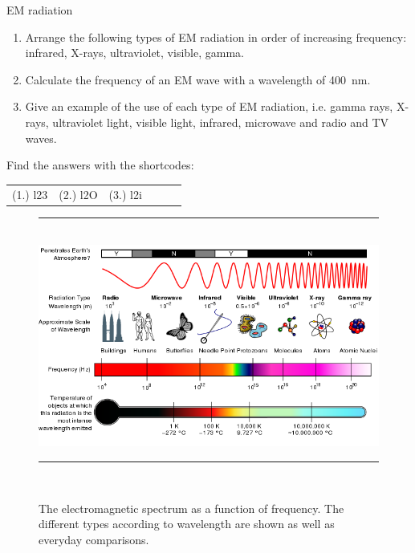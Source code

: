 \begin{exercises}{EM radiation}
            \nopagebreak
      \label{m38778*id188768}\begin{enumerate}[noitemsep, label=\textbf{\arabic*}. ] 
            \label{m38778*uid10}\item Arrange the following types of EM radiation in order of increasing frequency: infrared, X-rays, ultraviolet, visible, gamma.\newline
\label{m38778*uid11}\item Calculate the frequency of an EM wave with a wavelength of 400~nm.\newline
\label{m38778*uid12}\item Give an example of the use of each type of EM radiation, i.e. gamma rays, X-rays, ultraviolet light, visible light, infrared, microwave and radio and TV waves.\newline
\end{enumerate}
    \label{m38778*cid6}
\par {} Find the answers with the shortcodes:
 \par \begin{tabular}[h]{cccccc}
 (1.) l23  &  (2.) l2O  &  (3.) l2i  & \end{tabular}
\end{exercises}
	\begin{figure}[H] %
    \begin{center}
    \rule[.1in]{\figurerulewidth}{.005in} \\
        \label{m38778*uid3!!!underscore!!!media}\label{m38778*uid3!!!underscore!!!printimage}\includegraphics[width=\columnwidth]{col11305.imgs/m38778_EM_Spectrum_Properties_edit.png} %
      \label{fig:emspectrum}
      \caption{The electromagnetic spectrum as a function of frequency. The different types according to wavelength are shown as well as everyday comparisons.
	}
    \rule[.1in]{\figurerulewidth}{.005in} \\
    \end{center}
 \end{figure}       
